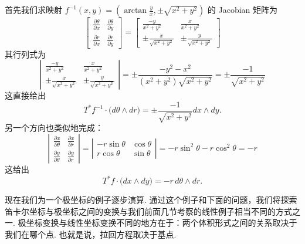 首先我们求映射 $f^{-1}(x,y)=\left(\arctan\frac{y}{x},\pm\sqrt{x^2+y^2}\right)$ 的 Jacobian 矩阵为
\[
\begin{bmatrix}
\frac{\partial\theta}{\partial x}&\frac{\partial\theta}{\partial y}\\
\frac{\partial r}{\partial x}&\frac{\partial r}{\partial y}
\end{bmatrix}
=
\begin{bmatrix}
\frac{-y}{x^2+y^2}&\frac{x}{x^2+y^2}\\
\pm\frac{x}{\sqrt{x^2+y^2}}&\pm\frac{y}{\sqrt{x^2+y^2}}
\end{bmatrix}
\]
其行列式为
\[
\left|\begin{matrix}
\frac{-y}{x^2+y^2}&\frac{x}{x^2+y^2}\\
\pm\frac{x}{\sqrt{x^2+y^2}}&\pm\frac{y}{\sqrt{x^2+y^2}}
\end{matrix}\right|
=\pm\frac{-y^2-x^2}{(x^2+y^2)\sqrt{x^2+y^2}}
=\pm\frac{-1}{\sqrt{x^2+y^2}}
\]
这直接给出
\[
T^*f^{-1}\cdot\bigl(d\theta\wedge dr\bigr)=\pm\frac{-1}{\sqrt{x^2+y^2}}dx\wedge dy.
\]
另一个方向也类似地完成：
\[
\left|\begin{matrix}
\frac{\partial x}{\partial\theta}&\frac{\partial x}{\partial r}\\
\frac{\partial y}{\partial\theta}&\frac{\partial y}{\partial r}
\end{matrix}\right|
=
\left|\begin{matrix}
-r\sin\theta&\cos\theta\\
r\cos\theta&\sin\theta
\end{matrix}\right|
=-r\sin^2\theta-r\cos^2\theta=-r
\]
这给出
\[
T^*f\cdot\bigl(dx\wedge dy\bigr)=-r\,d\theta\wedge dr.
\]

现在我们为一个极坐标的例子逐步演算. 通过这个例子和下面的问题，我们将探索笛卡尔坐标与极坐标之间的变换与我们前面几节考察的线性例子相当不同的方式之一. 极坐标变换与线性坐标变换不同的地方在于：两个体积形式之间的关系取决于我们在哪个点. 也就是说，拉回方程取决于基点.

